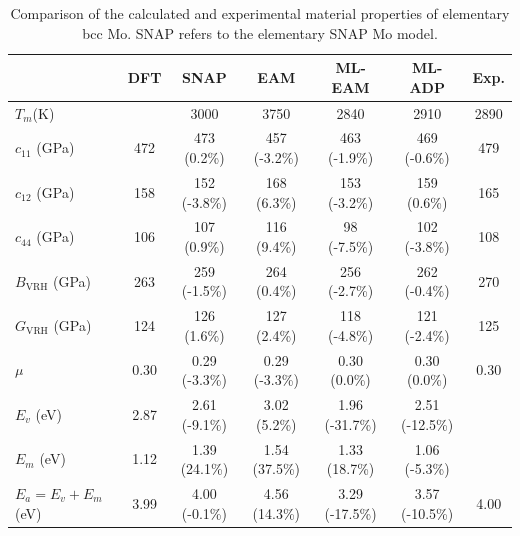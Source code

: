 \documentclass[prb,reprint,superscriptaddress]{revtex4-2}
\begin{document}
% 
%
\begin{table}
\centering
\begin{tabular}{lcccccc}
\hline
                              & DFT  & SNAP \cite{SNAP_Mo} & EAM \cite{ZJW2} & ML-EAM         & ML-ADP         & Exp.                      \\
\hline
$T_{m}$(K)                    &      & 3000                & 3750            & 2840           & 2910           & 2890                      \\
$c_{11}$ (GPa)                & 472  & 473 (0.2\%)         & 457 (-3.2\%)    & 463 (-1.9\%)   & 469 (-0.6\%)   & 479 \cite{Mo_Elastic_Exp} \\
$c_{12}$ (GPa)                & 158  & 152 (-3.8\%)        & 168 (6.3\%)     & 153 (-3.2\%)   & 159 (0.6\%)    & 165 \cite{Mo_Elastic_Exp} \\
$c_{44}$ (GPa)                & 106  & 107 (0.9\%)         & 116 (9.4\%)     & 98 (-7.5\%)    & 102 (-3.8\%)   & 108 \cite{Mo_Elastic_Exp} \\
$B_{\mathrm{VRH}}$ (GPa)      & 263  & 259 (-1.5\%)        & 264 (0.4\%)     & 256 (-2.7\%)   & 262 (-0.4\%)   & 270 \cite{Mo_Elastic_Exp} \\
$G_{\mathrm{VRH}}$ (GPa)      & 124  & 126 (1.6\%)         & 127 (2.4\%)     & 118 (-4.8\%)   & 121 (-2.4\%)   & 125 \cite{Mo_Elastic_Exp} \\
$\mu$                         & 0.30 & 0.29 (-3.3\%)       & 0.29 (-3.3\%)   & 0.30 (0.0\%)   & 0.30 (0.0\%)   & 0.30                      \\
$E_{v}$ (eV)                  & 2.87 & 2.61 (-9.1\%)       & 3.02 (5.2\%)    & 1.96 (-31.7\%) & 2.51 (-12.5\%) &                           \\
$E_{m}$ (eV)                  & 1.12 & 1.39 (24.1\%)       & 1.54 (37.5\%)   & 1.33 (18.7\%)  & 1.06 (-5.3\%)  &                           \\
$E_{a} = E_{v} + E_{m} $ (eV) & 3.99 & 4.00 (-0.1\%)       & 4.56 (14.3\%)   & 3.29 (-17.5\%) & 3.57 (-10.5\%) & 4.00 \cite{Mo_Ea_Exp}     \\
\hline
\end{tabular}
\caption{\label{table:Mo_properties} Comparison of the calculated and 
experimental material properties of elementary bcc Mo. SNAP refers to the 
elementary SNAP Mo model.
}
\end{table}
\end{document}
